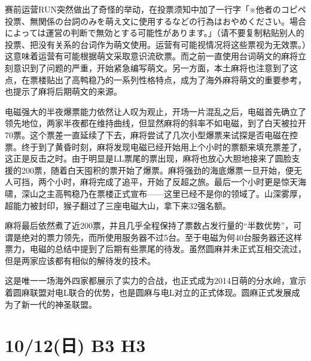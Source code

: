 赛前运营RUN突然做出了奇怪的举动，在投票须知中加了一行字「※他者のコピペ投票、無関係の台詞のみを萌え文に使用するなどの行為はおやめください。場合によっては運営の判断で無効とする可能性があります。」（请不要复制粘贴别人的投票、把没有关系的台词作为萌文使用。运营有可能视情况将这些票视为无效票。）这意味着运营有可能根据萌文采取意识流砍票。而之前一直使用台词萌文的麻将立刻意识到了问题的严重，开始紧急编写萌文。另一方面，本土麻将也注意到了这点，在票楼贴出了高鸭稳乃的一系列性格特点，成为了海外麻将萌文的重要参考，也提示了麻将后期萌文的来源。

电磁强大的半夜爆票能力依然让人叹为观止，开场一片混乱之后，电磁首先确立了领先地位，两家半夜都在维持曲线，但显然麻将的斜率不如电磁，到了白天被拉开70票。这个票差一直延续了下去，麻将尝试了几次小型爆票来试探是否电磁在控票。终于到了黄昏时刻，麻将发现电磁已经开始用上个小时的票额来填充票差了，这正是反击之时。由于明显是LL票尾的票出现，麻将也放心大胆地接来了圆脸支援的200票，随着白天囤积的票开始了爆票。麻将强劲的海底爆票一旦开始，便无人可挡，两个小时，麻将完成了追平，开始了反超之旅。最后一个小时更是惊天海啸，深山之主高鸭稳乃在票楼正式宣布——这里已经不是你的领域了。山深雾厚，超能力被封印，猴子翻过了三座电磁大山，拿下来32强名额。

麻将最后依然煮了近200票，并且几乎全程保持了票数占发行量的“半数优势”，可谓是绝对的票力领先，而所使用服务器不过5台。至于电磁为何40台服务器还这样票力，电磁的总结中提到了后期有些票尾的待发。虽然圆麻并未正式互相交流过，但是两家应该都有相似的解待发的技术。

这是唯一一场海外四家都展示了实力的合战，也正式成为2014日萌的分水岭，宣示着圆麻联盟对电L联合的优势，也是圆麻与电L对立的正式体现。圆麻正式发展成为了新一代的神圣联盟。

\section{10/12(日) B3 H3}


